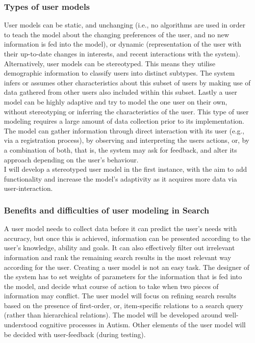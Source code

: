 \documentclass[10pt]{article}
\begin{document}
\subsubsection{Types of user models}
User models can be static, and unchanging (i.e., no algorithms are used in order to teach the model about the changing preferences of the user, and no new information is fed into the model), or dynamic (representation of the user with their up-to-date changes in interests, and recent interactions with the system). Alternatively, user models can be stereotyped. This means they utilise demographic information to classify users into distinct subtypes. The system infers or assumes other characteristics about this subset of users by making use of data gathered from other users also included within this subset. Lastly a user model can be highly adaptive and try to model the one user on their own, without stereotyping or inferring the characteristics of the user. This type of user modeling requires a large amount of data collection prior to its implementation.\\
The model can gather information through direct interaction with its user (e.g., via a registration process), by observing and interpreting the users actions, or, by a combination of both, that is, the system may ask for feedback, and alter its approach depending on the user’s behaviour.\\
I will develop a stereotyped user model in the first instance, with the aim to add functionality and increase the model's adaptivity as it acquires more data via user-interaction.

\subsubsection{Benefits and difficulties of user modeling in Search}
A user model needs to collect data before it can predict the user’s needs with accuracy, but once this is achieved, information can be presented according to the user’s knowledge, ability and goals. It can also effectively filter out irrelevant information and rank the remaining search results in the most relevant way according for the user.
Creating a user model is not an easy task. The designer of the system has to set weights of parameters for the information that is fed into the model, and decide what course of action to take when two pieces of information may conflict. The user model will focus on refining search results based on the presence of first-order, or, item-specific relations to a search query (rather than hierarchical relations). The model will be developed around well-understood cognitive processes in Autism. Other elements of the user model will be decided with user-feedback (during testing). 
\end{document}

